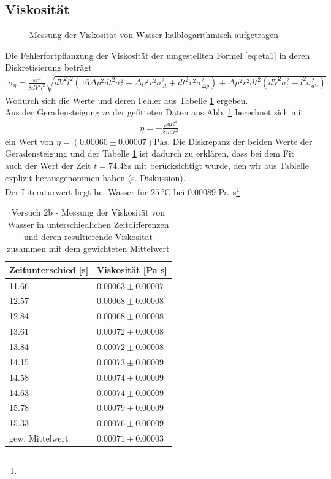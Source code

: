 \documentclass[12pt,a4paper,titlepage,headinclude,bibtotoc]{scrartcl}
\begin{document}
\subsection{Viskosität}
\begin{figure}
\centering

\caption{Messung der Viskosität von Wasser halblogarithmisch aufgetragen\label{fig:viskogerade}}
\end{figure}
Die Fehlerfortpflanzung der Viskosität der umgestellten Formel \eqref{eq:eta1} in deren Diskretisierung beträgt
\begin{align*}
\sigma_{\eta}=\frac{\pi r^{3}}{8  dV^{2} l^{2}} \sqrt{ dV^{2} l^{2} \left(16 \Delta p^{2} dt^{2} \sigma_{r}^{2} + \Delta p^{2} r^{2} \sigma_{dt}^{2} + dt^{2} r^{2} \sigma_{\Delta p}^{2}\right) +\Delta p^{2}r^{2}dt^{2} \left(dV^{2}   \sigma_{l}^{2} + l^{2} \sigma_{dV}^{2}\right)}
\end{align*}
Wodurch sich die Werte und deren Fehler aus Tabelle \ref{tbl:visko2b} ergeben.\\
Aus der Geradensteigung $m$ der gefitteten Daten aus Abb. \ref{fig:viskogerade} berechnet sich mit
\begin{align}
 \eta=-\frac{\rho g R^4}{8mlr^2}
\end{align}
ein Wert von $\eta=(0.00060 \pm 0.00007)\si{\Pa\s}$. Die Diskrepanz der beiden Werte der Geradensteigung und der Tabelle \ref{tbl:visko2b} ist dadurch zu erklären, dass bei dem Fit auch der Wert der Zeit $t=74.48$s mit berücksichtigt wurde, den wir aus Tablelle explizit herausgenommen haben (s. Diskussion).\\
Der Literaturwert liegt bei Wasser für $\SI{25}{\celsius}$ bei 0.00089 \si{\Pa\s}\footnote{}
\begin{table}[!h]
\centering
\begin{tabular}{|l|l|}
 \hline
Zeitunterschied [s] & Viskosität [Pa s]\\
\hline\hline
\num{11.66} & $0.00063 \pm 0.00007$\\
\hline
\num{12.57} & $0.00068 \pm 0.00008$\\
\hline
\num{12.84} & $0.00068 \pm 0.00008$\\
\hline
\num{13.61} & $0.00072 \pm 0.00008$\\
\hline
\num{13.84} & $0.00072 \pm 0.00008$\\
\hline
\num{14.15} & $0.00073 \pm 0.00009$\\
\hline
\num{14.58} & $0.00074 \pm 0.00009$\\
\hline
\num{14.63} & $0.00074 \pm 0.00009$\\
\hline
\num{15.78} & $0.00079 \pm 0.00009$\\
\hline
\num{15.33} & $0.00076 \pm 0.00009$\\
\hline\hline
gew. Mittelwert & $0.00071 \pm 0.00003$\\
\hline
\end{tabular}
\caption{Versuch 2b - Messung der Viskosität von Wasser in unterschiedlichen Zeitdifferenzen und deren resultierende Viskosität zusammen mit dem gewichteten Mittelwert\label{tbl:visko2b}}
\end{table}
\end{document}
